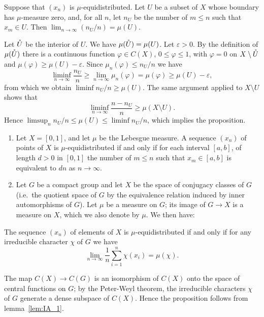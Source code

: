 \begin{subappendices}
\begin{prop}
Suppose that $(x_n)$ is $\mu$-equidistributed. Let $U$ be a subset of $X$ whose
boundary has $\mu$-measure zero, and, for all $n$, let $n_U$ be the number of
$m \le n$ such that $x_m \in U$. Then $\lim_{n\to\infty} (n_U/n) = \mu(U)$.
\end{prop}
Let $\mathring{U}$ be the interior of $U$. We have $\mu(\mathring{U}) = \mu(U)$.  Let
$\varepsilon > 0$.  By the definition of $\mu(\mathring{U})$ there is a continuous
function $\varphi \in C(X)$, $0 \le \varphi \le 1$, with $\varphi = 0$ on $X
\setminus \mathring{U}$ and $\mu(\varphi) \ge \mu(U) - \varepsilon$.  Since
$\mu_n(\varphi) \le n_U/n$ we have
\[
	\liminf_{n\to\infty} \frac{n_U}{n} \ge \lim_{n\to\infty} \mu_n(\varphi)
	= \mu(\varphi) \ge \mu(U) - \varepsilon,
\]
\dpage
from which we obtain $\liminf n_U/n \ge \mu(U)$. The same argument
applied to $X \setminus U$ shows that
$$ \liminf_{n\to\infty} \frac{n - n_U}{n} \ge \mu(X \setminus U). $$
Hence $\limsup_n n_U/n \le \mu(U) \le \liminf n_U/n$, which implies the
proposition.

\begin{ex}
\begin{enumerate}[label=\arabic*., ref=\arabic*]
\item Let $X = [0,1]$, and let $\mu$ be the Lebesgue measure. A sequence
	$(x_n)$ of points of $X$ is $\mu$-equidistributed if and only if for
	each interval $[a, b]$, of length $d > 0$ in $[0,1]$ the number of $m
	\le n$ such that $x_m \in [a, b]$ is equivalent to $dn$ as $n \to
	\infty$.
\item\label{ex:IA1_2}
	Let $G$ be a compact group and let $X$ be the space of conjugacy classes
	of $G$ (i.e.\ the quotient space of $G$ by the equivalence relation
	induced by inner automorphisms of $G$). Let $\mu$ be a measure on $G$;
	its image of $G \to X$ is a measure on $X$, which we also denote by
	$\mu$. We then have:
\end{enumerate}
\end{ex}
\begin{prop}\label{prop:IA_2}
The sequence $(x_n)$ of elements of $X$ is $\mu$-equidistributed if and only if
for any irreducible character $\chi$ of $G$ we have
$$ \lim_{n\to\infty} \frac{1}{n} \sum_{i=1}^{n} \chi(x_i) = \mu(\chi). $$
\end{prop}

The map $C(X) \to C(G)$ is an isomorphism of $C(X)$ onto the
space of central functions on $G$; by the Peter-Weyl theorem, the
\dpage
irreducible characters $\chi$ of $G$ generate a dense subspace of $C(X)$.
Hence the proposition follows from lemma~\ref{lem:IA_1}.


\end{subappendices}
